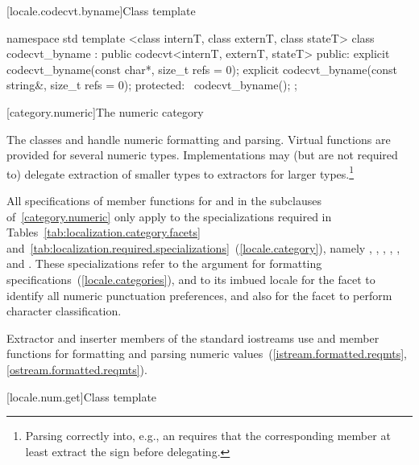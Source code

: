 [locale.codecvt.byname]{Class template }

%
\begin{codeblock}
namespace std {
  template <class internT, class externT, class stateT>
  class codecvt_byname : public codecvt<internT, externT, stateT> {
  public:
    explicit codecvt_byname(const char*, size_t refs = 0);
    explicit codecvt_byname(const string&, size_t refs = 0);
  protected:
    ~codecvt_byname();
  };
}
\end{codeblock}

[category.numeric]{The numeric category}

\pnum
The classes
and
handle numeric formatting and parsing.
Virtual functions are provided for several numeric types.
Implementations may (but are not required to) delegate extraction
of smaller types to extractors for larger types.\footnote{Parsing
 correctly into, e.g., an
requires that the corresponding member
at least extract the sign before delegating.}

\pnum
All specifications of member functions for
and
in the subclauses of~\ref{category.numeric} only apply to the
specializations required in Tables~\ref{tab:localization.category.facets}
and~\ref{tab:localization.required.specializations}~(\ref{locale.category}), namely
,
,
,
,
,
and
.
These specializations refer to the
argument for formatting specifications~(\ref{locale.categories}),
and to its imbued locale for the
facet to identify all numeric punctuation preferences,
and also for the
facet to perform character classification.

\pnum
Extractor and inserter members of the standard iostreams use
and
member functions for formatting and parsing numeric values~(\ref{istream.formatted.reqmts}, \ref{ostream.formatted.reqmts}).

[locale.num.get]{Class template }

